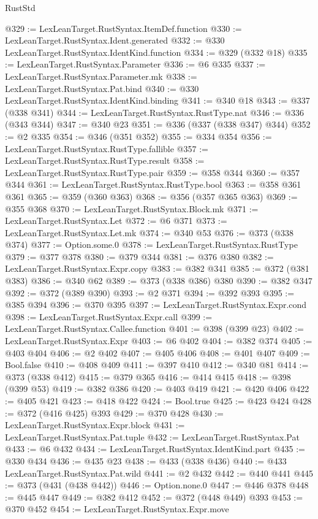 \begin{lexlean}{RustStd}
\begin{coremodule}
@329 := LexLeanTarget.RustSyntax.ItemDef.function
@330 := LexLeanTarget.RustSyntax.Ident.generated
@332 := @330 LexLeanTarget.RustSyntax.IdentKind.function
@334 := @329 (@332 @18)
@335 := LexLeanTarget.RustSyntax.Parameter
@336 := @6 @335
@337 := LexLeanTarget.RustSyntax.Parameter.mk
@338 := LexLeanTarget.RustSyntax.Pat.bind
@340 := @330 LexLeanTarget.RustSyntax.IdentKind.binding
@341 := @340 @18
@343 := @337 (@338 @341)
@344 := LexLeanTarget.RustSyntax.RustType.nat
@346 := @336 (@343 @344)
@347 := @340 @23
@351 := @336 (@337 (@338 @347) @344)
@352 := @2 @335
@354 := @346 (@351 @352)
@355 := @334 @354
@356 := LexLeanTarget.RustSyntax.RustType.fallible
@357 := LexLeanTarget.RustSyntax.RustType.result
@358 := LexLeanTarget.RustSyntax.RustType.pair
@359 := @358 @344
@360 := @357 @344
@361 := LexLeanTarget.RustSyntax.RustType.bool
@363 := @358 @361 @361
@365 := @359 (@360 @363)
@368 := @356 (@357 @365 @363)
@369 := @355 @368
@370 := LexLeanTarget.RustSyntax.Block.mk
@371 := LexLeanTarget.RustSyntax.Let
@372 := @6 @371
@373 := LexLeanTarget.RustSyntax.Let.mk
@374 := @340 @53
@376 := @373 (@338 @374)
@377 := Option.some.{0}
@378 := LexLeanTarget.RustSyntax.RustType
@379 := @377 @378
@380 := @379 @344
@381 := @376 @380
@382 := LexLeanTarget.RustSyntax.Expr.copy
@383 := @382 @341
@385 := @372 (@381 @383)
@386 := @340 @62
@389 := @373 (@338 @386) @380
@390 := @382 @347
@392 := @372 (@389 @390)
@393 := @2 @371
@394 := @392 @393
@395 := @385 @394
@396 := @370 @395
@397 := LexLeanTarget.RustSyntax.Expr.cond
@398 := LexLeanTarget.RustSyntax.Expr.call
@399 := LexLeanTarget.RustSyntax.Callee.function
@401 := @398 (@399 @23)
@402 := LexLeanTarget.RustSyntax.Expr
@403 := @6 @402
@404 := @382 @374
@405 := @403 @404
@406 := @2 @402
@407 := @405 @406
@408 := @401 @407
@409 := Bool.false
@410 := @408 @409
@411 := @397 @410
@412 := @340 @81
@414 := @373 (@338 @412)
@415 := @379 @365
@416 := @414 @415
@418 := @398 (@399 @53)
@419 := @382 @386
@420 := @403 @419
@421 := @420 @406
@422 := @405 @421
@423 := @418 @422
@424 := Bool.true
@425 := @423 @424
@428 := @372 (@416 @425) @393
@429 := @370 @428
@430 := LexLeanTarget.RustSyntax.Expr.block
@431 := LexLeanTarget.RustSyntax.Pat.tuple
@432 := LexLeanTarget.RustSyntax.Pat
@433 := @6 @432
@434 := LexLeanTarget.RustSyntax.IdentKind.part
@435 := @330 @434
@436 := @435 @23
@438 := @433 (@338 @436)
@440 := @433 LexLeanTarget.RustSyntax.Pat.wild
@441 := @2 @432
@442 := @440 @441
@445 := @373 (@431 (@438 @442))
@446 := Option.none.{0}
@447 := @446 @378
@448 := @445 @447
@449 := @382 @412
@452 := @372 (@448 @449) @393
@453 := @370 @452
@454 := LexLeanTarget.RustSyntax.Expr.move

\end{coremodule}
\end{lexlean}

